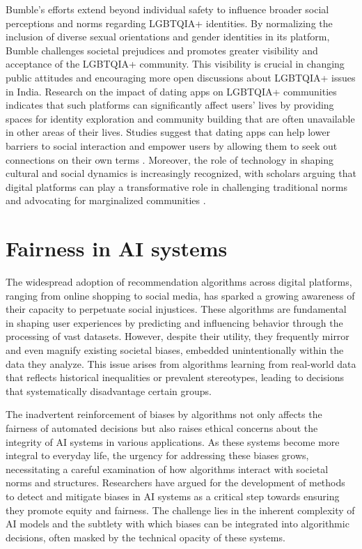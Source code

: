 Bumble’s efforts extend beyond individual safety to influence broader social perceptions and norms regarding LGBTQIA+ identities. By normalizing the inclusion of diverse sexual orientations and gender identities in its platform, Bumble challenges societal prejudices and promotes greater visibility and acceptance of the LGBTQIA+ community. This visibility is crucial in changing public attitudes and encouraging more open discussions about LGBTQIA+ issues in India. Research on the impact of dating apps on LGBTQIA+ communities indicates that such platforms can significantly affect users' lives by providing spaces for identity exploration and community building that are often unavailable in other areas of their lives. Studies suggest that dating apps can help lower barriers to social interaction and empower users by allowing them to seek out connections on their own terms \cite{Blackwell_2015}. Moreover, the role of technology in shaping cultural and social dynamics is increasingly recognized, with scholars arguing that digital platforms can play a transformative role in challenging traditional norms and advocating for marginalized communities \cite{Publishers_Distributors4753/23_Road_Delhi}.

\section{Fairness in AI systems}
The widespread adoption of recommendation algorithms across digital platforms, ranging from online shopping to social media, has sparked a growing awareness of their capacity to perpetuate social injustices. These algorithms are fundamental in shaping user experiences by predicting and influencing behavior through the processing of vast datasets. However, despite their utility, they frequently mirror and even magnify existing societal biases, embedded unintentionally within the data they analyze. This issue arises from algorithms learning from real-world data that reflects historical inequalities or prevalent stereotypes, leading to decisions that systematically disadvantage certain groups.

The inadvertent reinforcement of biases by algorithms not only affects the fairness of automated decisions but also raises ethical concerns about the integrity of AI systems in various applications. As these systems become more integral to everyday life, the urgency for addressing these biases grows, necessitating a careful examination of how algorithms interact with societal norms and structures. Researchers have argued for the development of methods to detect and mitigate biases in AI systems as a critical step towards ensuring they promote equity and fairness. The challenge lies in the inherent complexity of AI models and the subtlety with which biases can be integrated into algorithmic decisions, often masked by the technical opacity of these systems.

